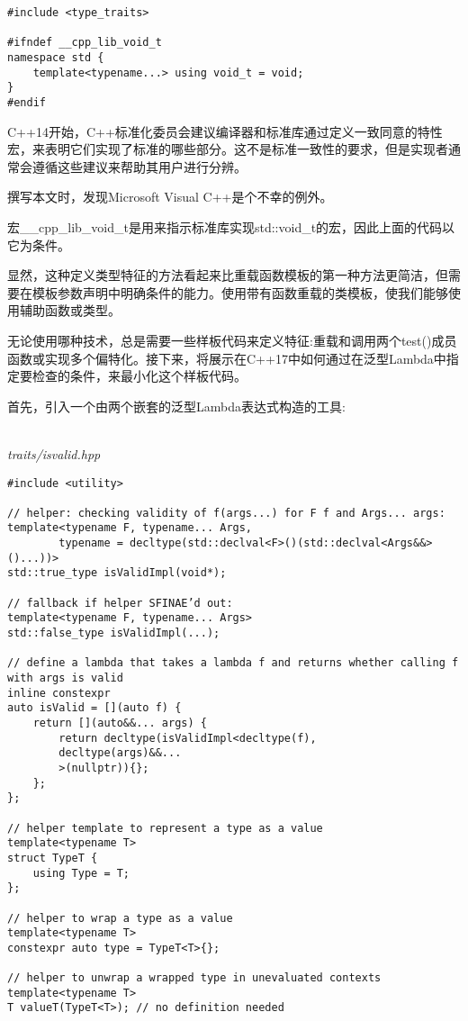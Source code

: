 \begin{lstlisting}[style=styleCXX]
#include <type_traits>

#ifndef __cpp_lib_void_t
namespace std {
	template<typename...> using void_t = void;
}
#endif
\end{lstlisting}

C++14开始，C++标准化委员会建议编译器和标准库通过定义一致同意的特性宏，来表明它们实现了标准的哪些部分。这不是标准一致性的要求，但是实现者通常会遵循这些建议来帮助其用户进行分辨。

\begin{tcolorbox}[colback=webgreen!5!white,colframe=webgreen!75!black]
\hspace*{0.75cm}撰写本文时，发现Microsoft Visual C++是个不幸的例外。
\end{tcolorbox}

宏\_\_cpp\_lib\_void\_t是用来指示标准库实现std::void\_t的宏，因此上面的代码以它为条件。

显然，这种定义类型特征的方法看起来比重载函数模板的第一种方法更简洁，但需要在模板参数声明中明确条件的能力。使用带有函数重载的类模板，使我们能够使用辅助函数或类型。


无论使用哪种技术，总是需要一些样板代码来定义特征:重载和调用两个test()成员函数或实现多个偏特化。接下来，将展示在C++17中如何通过在泛型Lambda中指定要检查的条件，来最小化这个样板代码。

首先，引入一个由两个嵌套的泛型Lambda表达式构造的工具:

\hspace*{\fill} \\ %
\noindent
\textit{traits/isvalid.hpp}
\begin{lstlisting}[style=styleCXX]
#include <utility>

// helper: checking validity of f(args...) for F f and Args... args:
template<typename F, typename... Args,
		typename = decltype(std::declval<F>()(std::declval<Args&&>()...))>
std::true_type isValidImpl(void*);

// fallback if helper SFINAE’d out:
template<typename F, typename... Args>
std::false_type isValidImpl(...);

// define a lambda that takes a lambda f and returns whether calling f with args is valid
inline constexpr
auto isValid = [](auto f) {
	return [](auto&&... args) {
		return decltype(isValidImpl<decltype(f),
		decltype(args)&&...
		>(nullptr)){};
	};
};

// helper template to represent a type as a value
template<typename T>
struct TypeT {
	using Type = T;
};

// helper to wrap a type as a value
template<typename T>
constexpr auto type = TypeT<T>{};

// helper to unwrap a wrapped type in unevaluated contexts
template<typename T>
T valueT(TypeT<T>); // no definition needed
\end{lstlisting}

